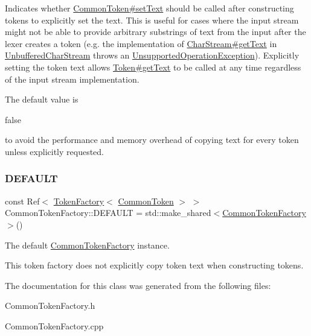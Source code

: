 Indicates whether \hyperlink{classantlr4_1_1CommonToken_a2963f31fa12fdb1c5c26711004177554}{Common\+Token\#set\+Text} should be called after constructing tokens to explicitly set the text. This is useful for cases where the input stream might not be able to provide arbitrary substrings of text from the input after the lexer creates a token (e.\+g. the implementation of \hyperlink{}{Char\+Stream\#get\+Text} in \hyperlink{}{Unbuffered\+Char\+Stream} throws an \hyperlink{classantlr4_1_1UnsupportedOperationException}{Unsupported\+Operation\+Exception}). Explicitly setting the token text allows \hyperlink{classantlr4_1_1Token_ae288d9f2d72d0209a24e0cc5215e8844}{Token\#get\+Text} to be called at any time regardless of the input stream implementation.

The default value is
\begin{DoxyCode}
\textcolor{keyword}{false} 
\end{DoxyCode}
 to avoid the performance and memory overhead of copying text for every token unless explicitly requested.\mbox{\label{classantlr4_1_1CommonTokenFactory_a141e9716e14a7b5c43a6d0bd3db82bcd}} 
\subsubsection{\texorpdfstring{D\+E\+F\+A\+U\+LT}{DEFAULT}}
{\footnotesize\ttfamily const Ref$<$ \hyperlink{classantlr4_1_1TokenFactory}{Token\+Factory}$<$ \hyperlink{classantlr4_1_1CommonToken}{Common\+Token} $>$ $>$ Common\+Token\+Factory\+::\+D\+E\+F\+A\+U\+LT = std\+::make\+\_\+shared$<$\hyperlink{classantlr4_1_1CommonTokenFactory}{Common\+Token\+Factory}$>$()\hspace{0.3cm}{\ttfamily [static]}}

The default \hyperlink{classantlr4_1_1CommonTokenFactory}{Common\+Token\+Factory} instance.

This token factory does not explicitly copy token text when constructing tokens.

The documentation for this class was generated from the following files\+:\begin{DoxyCompactItemize}
\item 
Common\+Token\+Factory.\+h\item 
Common\+Token\+Factory.\+cpp\end{DoxyCompactItemize}
